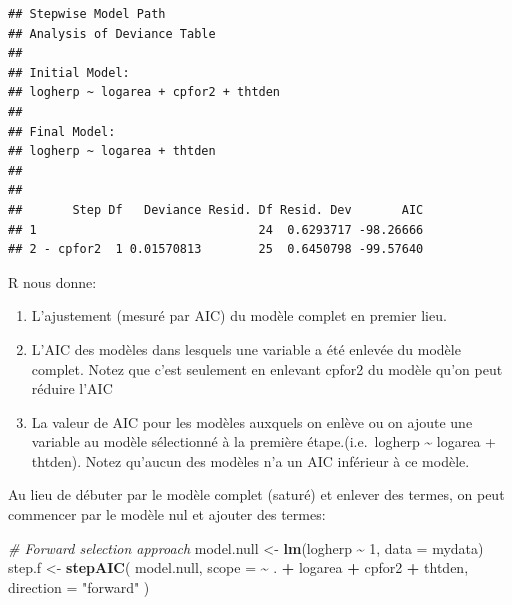 \documentclass[
  12pt,
]{book}
\newenvironment{Shaded}{\begin{snugshade}}{\end{snugshade}}
\newcommand{\CommentTok}[1]{\textcolor[rgb]{0.56,0.35,0.01}{\textit{#1}}}
\newcommand{\DataTypeTok}[1]{\textcolor[rgb]{0.13,0.29,0.53}{#1}}
\newcommand{\DecValTok}[1]{\textcolor[rgb]{0.00,0.00,0.81}{#1}}
\newcommand{\KeywordTok}[1]{\textcolor[rgb]{0.13,0.29,0.53}{\textbf{#1}}}
\newcommand{\NormalTok}[1]{#1}
\newcommand{\OperatorTok}[1]{\textcolor[rgb]{0.81,0.36,0.00}{\textbf{#1}}}
\newcommand{\StringTok}[1]{\textcolor[rgb]{0.31,0.60,0.02}{#1}}
\providecommand{\tightlist}{%
  \setlength{\itemsep}{0pt}\setlength{\parskip}{0pt}}
\begin{document}
\begin{Shaded}
\end{Shaded}

\begin{verbatim}
## Stepwise Model Path 
## Analysis of Deviance Table
## 
## Initial Model:
## logherp ~ logarea + cpfor2 + thtden
## 
## Final Model:
## logherp ~ logarea + thtden
## 
## 
##       Step Df   Deviance Resid. Df Resid. Dev       AIC
## 1                               24  0.6293717 -98.26666
## 2 - cpfor2  1 0.01570813        25  0.6450798 -99.57640
\end{verbatim}

R nous donne:

\begin{enumerate}
\def\labelenumi{\arabic{enumi}.}
\tightlist
\item
  L'ajustement (mesuré par AIC) du modèle complet en premier lieu.
\item
  L'AIC des modèles dans lesquels une variable a été enlevée du modèle complet. Notez que c'est seulement en enlevant cpfor2 du modèle qu'on peut réduire l'AIC
\item
  La valeur de AIC pour les modèles auxquels on enlève ou on ajoute une variable au modèle sélectionné à la première étape.(i.e.~logherp \textasciitilde{} logarea + thtden). Notez qu'aucun des modèles n'a un AIC inférieur à ce modèle.
\end{enumerate}

Au lieu de débuter par le modèle complet (saturé) et enlever des termes, on peut commencer par le modèle nul et ajouter des termes:

\begin{Shaded}
\begin{Highlighting}[]
\CommentTok{\# Forward selection approach}
\NormalTok{model.null \textless{}{-}}\StringTok{ }\KeywordTok{lm}\NormalTok{(logherp }\OperatorTok{\textasciitilde{}}\StringTok{ }\DecValTok{1}\NormalTok{, }\DataTypeTok{data =}\NormalTok{ mydata)}
\NormalTok{step.f \textless{}{-}}\StringTok{ }\KeywordTok{stepAIC}\NormalTok{(}
\NormalTok{  model.null,}
  \DataTypeTok{scope =} \OperatorTok{\textasciitilde{}}\StringTok{ }\NormalTok{. }\OperatorTok{+}\StringTok{ }\NormalTok{logarea }\OperatorTok{+}\StringTok{ }\NormalTok{cpfor2 }\OperatorTok{+}\StringTok{ }\NormalTok{thtden, }\DataTypeTok{direction =} \StringTok{"forward"}
\NormalTok{)}
\end{Highlighting}
\end{Shaded}
\end{document}
